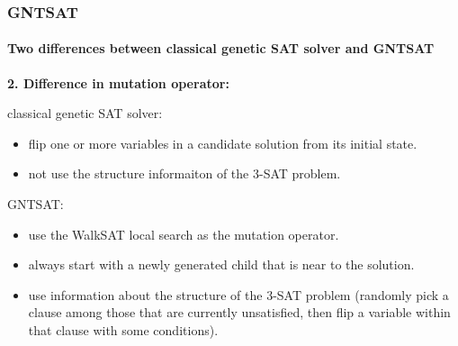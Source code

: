 \begin{frame}[t]
	\frametitle{GNTSAT}
	\framesubtitle{Two differences between classical genetic SAT solver and GNTSAT}
	\textbf{2. Difference in mutation operator:}
	\begin{block}{classical genetic SAT solver:}
		\begin{itemize}
		\item flip one or more variables in a candidate solution from its initial state.
		\item not use the structure informaiton of the 3-SAT problem.
		\end{itemize}
	\end{block}
	\begin{block}{GNTSAT:}	
		\begin{itemize}
		\item use the WalkSAT local search as the mutation operator.
		\item always start with a newly generated child that is near to the solution.
		\item use information about the structure of the 3-SAT problem (randomly pick a clause among those that are currently unsatisfied, then flip a variable within that clause with some conditions).
		\end{itemize}
	\end{block}
\end{frame}
